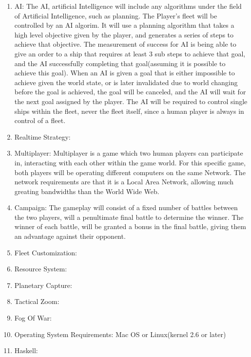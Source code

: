 \begin{enumerate}

\item AI:
The AI, artificial Intelligence will include any algorithms under the field of Artificial Intelligence, such as planning.
The Player's fleet will be controlled by an AI algorim. It will use a planning algorithm that takes a high level objective given by the player, and generates a series of steps to achieve that objective.
The measurement of success for AI is being able to give an order to a ship that requires at least 3 sub steps to achieve that goal, and the AI successfully completing that goal(assuming it is possible to achieve this goal).
When an AI is given a goal that is either impossible to achieve given the world state, or is later invalidated due to world changing before the goal is achieved, the goal will be canceled, and the AI will wait for the next goal assigned by the player.
The AI will be required to control single ships within the fleet, never the fleet itself, since a human player is always in control of a fleet.

\item Realtime Strategy:


\item Multiplayer:
Multiplayer is a game which two human players can participate in, interacting with each other within the game world.
For this specific game, both players will be operating different computers on the same Network.
The network requirements are that it is a Local Area Network, allowing much greating bandwidths than the World Wide Web.

\item Campaign:
The gameplay will consist of a fixed number of battles between the two players, will a penultimate final battle to determine the winner.
The winner of each battle, will be granted a bonus in the final battle, giving them an advantage against their opponent.

\item Fleet Customization:



\item Resource System:

\item Planetary Capture:

\item Tactical Zoom:

\item Fog Of War:

\item Operating System Requirements:
Mac OS or Linux(kernel 2.6 or later) 

\item Haskell:

\end{enumerate}


